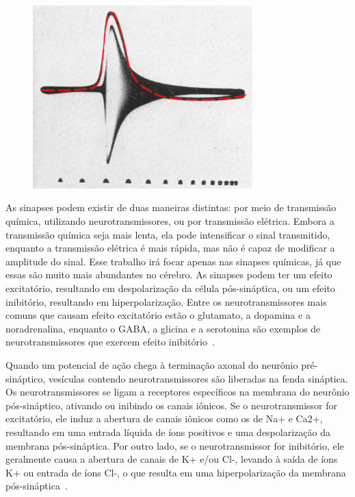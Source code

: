 \begin{figure}[!ht]
\centering
\includegraphics[width=8.5cm]{figuras/Action Potential.png}
\end{figure}

As sinapses podem existir de duas maneiras distintas: por meio de transmissão química, utilizando neurotransmissores, ou por
transmissão elétrica. Embora a transmissão química seja mais lenta, ela pode intensificar o sinal transmitido, enquanto a
transmissão elétrica é mais rápida, mas não é capaz de modificar a amplitude do sinal. Esse trabalho irá focar apenas nas sinapses
químicas, já que essas são muito mais abundantes no cérebro. As sinapses podem ter um efeito excitatório, resultando em
despolarização da célula pós-sináptica, ou um efeito inibitório, resultando em hiperpolarização. Entre os neurotransmissores mais
comuns que causam efeito excitatório estão o glutamato, a dopamina e a noradrenalina, enquanto o GABA, a glicina e a serotonina
são exemplos de neurotransmissores que exercem efeito inibitório~\cite{kandelPrinciples2021}.

Quando um potencial de ação chega à terminação axonal do neurônio pré-sináptico, vesículas contendo neurotransmissores são
liberadas na fenda sináptica. Os neurotransmissores se ligam a receptores específicos na membrana do neurônio pós-sináptico,
ativando ou inibindo os canais iônicos. Se o neurotransmissor for excitatório, ele induz a abertura de canais iônicos como os de
Na+ e Ca2+, resultando em uma entrada líquida de íons positivos e uma despolarização da membrana pós-sináptica. Por outro lado, se
o neurotransmissor for inibitório, ele geralmente causa a abertura de canais de K+ e/ou Cl-, levando à saída de íons K+ ou entrada
de íons Cl-, o que resulta em uma hiperpolarização da membrana pós-sináptica~\cite{kandelPrinciples2021}.